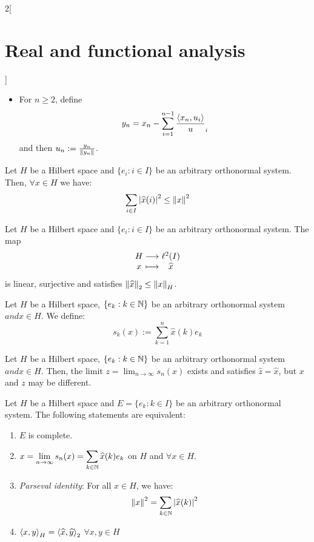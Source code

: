 \documentclass[../../../main_math.tex]{subfiles}
\begin{document}
\begin{multicols}{2}[\section{Real and functional analysis}]
\begin{proposition}
\begin{itemize}
      \item For $n\geq 2$, define $$y_n=x_n-\sum_{i=1}^{n-1}\frac{{\left\langle x_n,u_i\right\rangle}}u_i$$
            and then $u_n:=\frac{y_n}{\left\|y_n\right\|}$.
    \end{itemize}
  \end{proposition}
  \begin{theorem}
    Let $H$ be a Hilbert space and $\{e_i:i\in I\}$ be an arbitrary orthonormal system. Then, $\forall x\in H$ we have: $$\sum_{i\in I}\abs{\widehat{x}(i)}^2\leq\left\|x\right\|^2$$
  \end{theorem}
  \begin{lemma}
    Let $H$ be a Hilbert space and $\{e_i:i\in I\}$ be an arbitrary orthonormal system. The map $$\function{}{H}{\ell^2(I)}{x}{\widehat{x}}$$ is linear, surjective and satisfies $\left\|\widehat{x}\right\|_2\leq\left\|x\right\|_H$.
  \end{lemma}
  \begin{definition}
    Let $H$ be a Hilbert space, $\{e_k:k\in\mathbb{N}\}$ be an arbitrary orthonormal system $and x\in H$. We define: $$s_k(x):=\sum_{k=1}^n\widehat{x}(k)e_k$$
  \end{definition}
  \begin{lemma}
    Let $H$ be a Hilbert space, $\{e_k:k\in\mathbb{N}\}$ be an arbitrary orthonormal system $and x\in H$. Then, the limit $z = \lim_{n\to\infty} s_n(x)$ exists and satisfies $\widehat{z}=\widehat{x}$, but $x$ and $z$ may be different.
  \end{lemma}
  \begin{theorem}
    Let $H$ be a Hilbert space and $E=\{e_k:k\in I\}$ be an arbitrary orthonormal system. The following statements are equivalent:
    \begin{enumerate}
      \item $E$ is complete.
      \item $\displaystyle x=\lim_{n\to\infty} s_n(x)=\sum_{k\in \mathbb{N}} \widehat{x}(k)e_k$ on $H$ and $\forall x\in H$.
      \item \emph{Parseval identity}: For all $x\in H$, we have: $$\left\|x\right\|^2=\sum_{k\in\mathbb{N}}\abs{\widehat{x}(k)}^2$$
      \item ${\left\langle x,y\right\rangle}_H={\left\langle\widehat{x},\widehat{y}\right\rangle}_2$ $\forall x,y\in H$
    \end{enumerate}
  \end{theorem}

\end{multicols}
\end{document}
